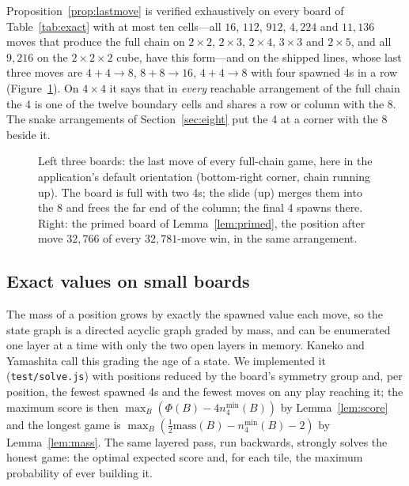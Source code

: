 \documentclass[11pt]{article}
\theoremstyle{definition}
\theoremstyle{remark}
\newcommand{\Phichain}{\Phi}
\newcommand{\nfour}{n_4}
\newcommand{\mass}{\mathrm{mass}}
\begin{document}
Proposition~\ref{prop:lastmove} is verified exhaustively on every board
of Table~\ref{tab:exact} with at most ten cells---all $16$, $112$, $912$,
$4{,}224$ and $11{,}136$ moves that produce the full chain on $2\times2$,
$2\times3$, $2\times4$, $3\times3$ and $2\times5$, and all $9{,}216$ on
the $2\times2\times2$ cube, have this form---and on the shipped lines, whose last three moves
are $4+4\to8$, $8+8\to16$, $4+4\to8$ with four spawned 4s in a row
(Figure~\ref{fig:lastmove}). On $4\times4$ it says that in
\emph{every} reachable arrangement of the full chain the 4 is one of the
twelve boundary cells and shares a row or column with the 8. The snake
arrangements of Section~\ref{sec:eight} put the 4 at a corner with the 8
beside it.

\begin{figure}[t]
\centering
\FigLastMoveA\hfill\FigLastMoveB\hfill\FigLastMoveC\hfill\FigPrimed
\caption{Left three boards: the last move of every full-chain game, here in
the application's default orientation (bottom-right corner, chain running
up). The board is full with two 4s; the slide (up) merges them into the 8
and frees the far end of the column; the final 4 spawns there. Right: the
primed board of Lemma~\ref{lem:primed}, the position after move $32{,}766$
of every $32{,}781$-move win, in the same arrangement.}
\label{fig:lastmove}
\end{figure}

\subsection{Exact values on small boards}\label{sec:exact}

The mass of a position grows by exactly the spawned value each move, so
the state graph is a directed acyclic graph graded by mass, and can be
enumerated one layer at a time with only the two open layers in memory.
Kaneko and Yamashita \cite{kaneko2026} call this grading the age of a
state. We implemented it (\texttt{test/solve.js}) with positions reduced
by the board's symmetry group and, per position, the fewest spawned 4s
and the fewest moves on any play reaching it; the maximum score is then
$\max_B(\Phichain(B)-4\nfour^{\min}(B))$ by Lemma~\ref{lem:score} and the
longest game is $\max_B(\tfrac12\mass(B)-\nfour^{\min}(B)-2)$ by
Lemma~\ref{lem:mass}. The same layered pass, run backwards, strongly
solves the honest game: the optimal expected score and, for each tile,
the maximum probability of ever building it.
\end{document}
